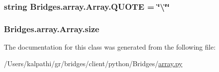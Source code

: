 \subsubsection[{Q\+U\+O\+T\+E}]{\setlength{\rightskip}{0pt plus 5cm}string Bridges.\+array.\+Array.\+Q\+U\+O\+T\+E = \char`\"{}\textbackslash{}\char`\"{}\char`\"{}\hspace{0.3cm}{\ttfamily [static]}}\label{class_bridges_1_1array_1_1_array_ab951298b5e08d36d671ac2ebb2ec21f0}
\hypertarget{class_bridges_1_1array_1_1_array_a9f23993cd6d215880b0c126d459f05d2}{}
\subsubsection[{size}]{\setlength{\rightskip}{0pt plus 5cm}Bridges.\+array.\+Array.\+size}\label{class_bridges_1_1array_1_1_array_a9f23993cd6d215880b0c126d459f05d2}


The documentation for this class was generated from the following file\+:\begin{DoxyCompactItemize}
\item 
/\+Users/kalpathi/gr/bridges/client/python/\+Bridges/\hyperlink{array_8py}{array.\+py}\end{DoxyCompactItemize}
